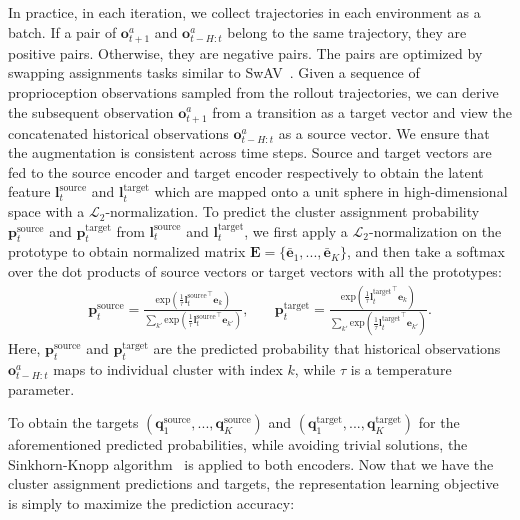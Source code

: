 In practice, in each iteration, we collect trajectories in each environment as a batch. 
If a pair of $\mathbf{o}_{t+1}^a$ and $\mathbf{o}_{t-H:t}^a$ belong to the same trajectory, they are positive pairs. Otherwise, they are negative pairs.
The pairs are optimized by swapping assignments tasks similar to SwAV~\citep{caron2020unsupervised}. 
Given a sequence of proprioception observations sampled from the rollout trajectories, we can derive the subsequent observation $\mathbf{o}^a_{t+1}$ from a transition as a target vector and view the concatenated historical observations $\mathbf{o}^a_{t-H: t}$ as a source vector. 
We ensure that the augmentation is consistent across time steps. 
Source and target vectors are fed to the source encoder and target encoder respectively to obtain the latent feature $\mathbf{l}^{\text{source}}_t$ and $\mathbf{l}^{\text{target}}_t$ which are mapped onto a unit sphere in high-dimensional space with a $\mathcal{L}_2$-normalization.
To predict the cluster assignment probability $\mathbf{p}^{\text{source}}_t$ and $\mathbf{p}^{\text{target}}_t$ from $\mathbf{l}^{\text{source}}_t$ and $\mathbf{l}^{\text{target}}_t$, we first apply a $\mathcal{L}_2$-normalization on the prototype to obtain normalized matrix $\mathbf{E}=\{ \bar{\mathbf{e}}_1, ..., \bar{\mathbf{e}}_K \}$, and then take a softmax over the dot products of source vectors or target vectors with all the prototypes:
\begin{equation}
\begin{aligned}
    \mathbf{p}^{\text{source}}_t = \frac{\text{exp}(\frac{1}{\tau} {\mathbf{l}^{\text{source}}_t}^\top\mathbf{e}_k)}{\sum_{k'}\text{exp}(\frac{1}{\tau} {\mathbf{l}^{\text{source}}_t}^\top\mathbf{e}_{k'})},
\end{aligned}
\quad
\begin{aligned}
    \mathbf{p}^{\text{target}}_t = \frac{\text{exp}(\frac{1}{\tau} {\mathbf{l}^{\text{target}}_t}^\top\mathbf{e}_k)}{\sum_{k'}\text{exp}(\frac{1}{\tau} {\mathbf{l}^{\text{target}}_t}^\top\mathbf{e}_{k'})}.
\end{aligned}
\end{equation}
Here, $\mathbf{p}_t^{\text{source}}$ and $\mathbf{p}_t^{\text{target}}$ are the predicted probability that historical observations $\mathbf{o}^a_{t-H: t}$ maps to individual cluster with index $k$, while $\tau$ is a temperature parameter.


To obtain the targets $(\mathbf{q}^{\text{source}}_1, . . . , \mathbf{q}^{\text{source}}_K)$ and $(\mathbf{q}^{\text{target}}_1, . . . , \mathbf{q}^{\text{target}}_K)$ for the aforementioned predicted probabilities, while avoiding trivial solutions, the Sinkhorn-Knopp algorithm~\citep{cuturi2013sinkhorn} is applied to both encoders. Now that we have the cluster assignment predictions and targets, the representation learning objective is simply to maximize the prediction accuracy:

